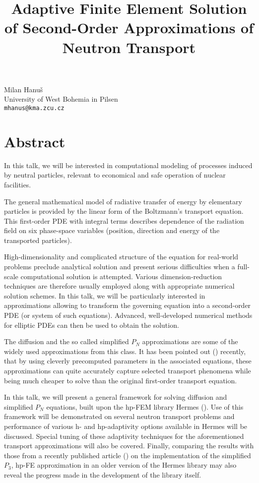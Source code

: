 \title{Adaptive Finite Element Solution of Second-Order Approximations of Neutron Transport}
 \author{} \institute{}
\maketitle
\begin{center}
{\large Milan Hanu{\v s}}\\
University of West Bohemia in Pilsen\\
{\tt mhanus@kma.zcu.cz}

\end{center}

\section*{Abstract}

In this talk, we will be interested in computational modeling of processes induced by neutral particles, relevant to economical and safe operation of nuclear facilities. 

The general mathematical model of radiative transfer of energy by elementary particles is provided by the linear form of the Boltzmann's transport equation. This first-order PDE with integral terms describes dependence of the radiation field on six phase-space variables (position, direction and energy of the transported particles). 

High-dimensionality and complicated structure of the equation for real-world problems preclude analytical solution and present serious difficulties when a full-scale computational solution is attempted. Various dimension-reduction techniques are therefore usually employed along with appropriate numerical solution schemes. In this talk, we will be particularly interested in approximations allowing to transform the governing equation into a second-order PDE (or system of such equations). Advanced, well-developed numerical methods for elliptic PDEs can then be used to obtain the solution. 

The diffusion and the so called simplified $P_N$ approximations are some of the widely used approximations from this class. It has been pointed out (\cite{Larsen2,Larsen4}) recently, that by using cleverly precomputed parameters in the associated equations, these approximations can quite accurately capture selected transport phenomena while being much cheaper to solve than the original first-order transport equation. 

In this talk, we will present a general framework for solving diffusion and simplified $P_N$ equations, built upon the hp-FEM library Hermes (\cite{Hermes}). Use of this framework will be demonstrated on several neutron transport problems and performance of various h- and hp-adaptivity options available in Hermes will be discussed. Special tuning of these adaptivity techniques for the aforementioned transport approximations will also be covered. Finally, comparing the results with those from a recently published article (\cite{Ragusa1}) on the implementation of the simplified $P_3$, hp-FE approximation in an older version of the Hermes library may also reveal the progress made in the development of the library itself.


